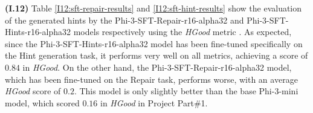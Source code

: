 \documentclass{article}
\begin{document}

\textbf{(I.12)} Table \ref{I12:sft-repair-results} and \ref{I12:sft-hint-results} show the evaluation of the generated hints by the Phi-3-SFT-Repair-r16-alpha32 and Phi-3-SFT-Hints-r16-alpha32 models respectively using the \emph{HGood} metric \cite{HintsInBrowser2024}. As expected, since the Phi-3-SFT-Hints-r16-alpha32 model has been fine-tuned specifically on the Hint generation task, it performs very well on all metrics, achieving a score of $0.84$ in \emph{HGood}. On the other hand, the Phi-3-SFT-Repair-r16-alpha32 model, which has been fine-tuned on the Repair task, performs worse, with an average \emph{HGood} score of $0.2$. This model is only slightly better than the base Phi-3-mini model, which scored $0.16$ in \emph{HGood} in Project Part\#1.
\end{document}
